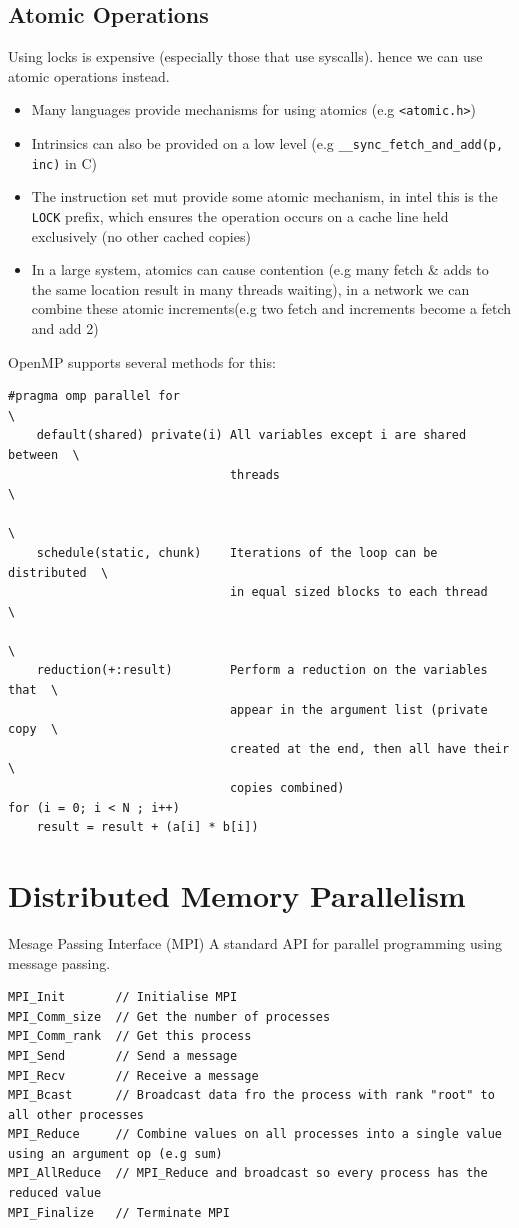 \subsection{Atomic Operations}
Using locks is expensive (especially those that use syscalls). hence we can use atomic operations instead.
\begin{itemize}
	\item Many languages provide mechanisms for using atomics (e.g \texttt{<atomic.h>})
	\item Intrinsics can also be provided on a low level (e.g \texttt{__sync_fetch_and_add(p, inc)} in C)
	\item The instruction set mut provide some atomic mechanism, in intel this is the \texttt{LOCK} prefix, which ensures the operation occurs on a cache line held exclusively (no other cached copies)
	\item In a large system, atomics can cause contention (e.g many fetch \& adds to the same location result in many threads waiting), in a network we can combine these atomic increments(e.g two fetch and increments become a fetch and add 2)
\end{itemize}
OpenMP supports several methods for this:
\begin{verbatim}
#pragma omp parallel for                                                  \
    default(shared) private(i) All variables except i are shared between  \
                               threads                                    \
                                                                          \
    schedule(static, chunk)    Iterations of the loop can be distributed  \
                               in equal sized blocks to each thread       \
                                                                          \
    reduction(+:result)        Perform a reduction on the variables that  \
                               appear in the argument list (private copy  \
                               created at the end, then all have their    \
                               copies combined)                           
for (i = 0; i < N ; i++)
    result = result + (a[i] * b[i])
\end{verbatim}

\section{Distributed Memory Parallelism}
\begin{definitionbox}{Mesage Passing Interface (MPI)}
	A standard API for parallel programming using message passing.
	\begin{verbatim}
MPI_Init       // Initialise MPI 
MPI_Comm_size  // Get the number of processes
MPI_Comm_rank  // Get this process
MPI_Send       // Send a message
MPI_Recv       // Receive a message
MPI_Bcast      // Broadcast data fro the process with rank "root" to all other processes
MPI_Reduce     // Combine values on all processes into a single value using an argument op (e.g sum)
MPI_AllReduce  // MPI_Reduce and broadcast so every process has the reduced value
MPI_Finalize   // Terminate MPI
    \end{verbatim}
\end{definitionbox}

